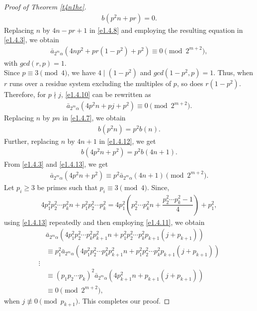 \documentclass[11pt,a4paper]{article}
\numberwithin{equation}{section}
\theoremstyle{plain}
\begin{document}
\begin{proof}[Proof of Theorem \ref{t4n1he}\unskip]
\begin{align}
b(p^2n+pr)=0.
\end{align}
Replacing $n$ by $4n-pr+1$ in \eqref{e1.4.8} and employing the resulting equation in \eqref{e1.4.3}, we obtain
\begin{align}\label{e1.4.10}
\bar{a}_{2^m\alpha}\left(4np^2+pr(1-p^2)+p^2\right)\equiv 0\pmod {2^{m+2}},
\end{align}
with $gcd(r,p)=1$.\\
Since $p\equiv 3\pmod 4$, we have $4\mid(1-p^2)$ and $gcd(1-p^2,p)=1$. Thus, when $r$ runs over a residue system excluding the multiples of $p$, so does $r(1-p^2)$. Therefore, for $p\nmid j$, \eqref{e1.4.10} can be rewritten as 
\begin{align}\label{e1.4.11}
\bar{a}_{2^m\alpha}(4p^2n+pj+p^2)\equiv 0\pmod {2^{m+2}}.
\end{align}
Replacing $n$ by $pn$ in \eqref{e1.4.7}, we obtain
\begin{align}\label{e1.4.12}
b(p^2n)=p^2b(n).
\end{align}
Further, replacing $n$ by $4n+1$ in \eqref{e1.4.12}, we get
\begin{align}\label{e1.4.13}
b(4p^2n+p^2)=p^2b(4n+1).
\end{align}
From \eqref{e1.4.3} and \eqref{e1.4.13}, we get
\begin{align}
\bar{a}_{2^m\alpha}(4p^2n+p^2)\equiv p^2\bar{a}_{2^m\alpha}(4n+1)\pmod{2^{m+2}}.
\end{align}
Let $p_i\ge 3$ be primes such that $p_i\equiv 3\pmod 4$. Since,
\begin{align*}
4p_1^2p_2^2\cdots p_k^2 n+p_1^2p_2^2\cdots p_k^2=4p_1^2\left(p_2^2\cdots p_k^2 n+\dfrac{p_2^2\cdots p_k^2 -1}{4}\right)+p_1^2,
\end{align*}
using \eqref{e1.4.13} repeatedly and then employing \eqref{e1.4.11}, we obtain
\begin{align*}
&\bar{a}_{2^m\alpha}\left(4p_1^2p_2^2\cdots p_k^2p_{k+1}^2n+p_1^2p_2^2\cdots p_k^2p_{k+1}\left(j+p_{k+1}\right)\right)\\
&\equiv p_1^2 \bar{a}_{2^m\alpha}\left(4p_1^2p_2^2\cdots p_k^2p_{k+1}^2n+p_1^2p_2^2\cdots p_k^2p_{k+1}\left(j+p_{k+1}\right)\right)\\
\vdots\\
&\equiv (p_1p_2\cdots p_k)^2\bar{a}_{2^m\alpha}\left(4p_{k+1}^2n+p_{k+1}(j+p_{k+1})\right)\\
&\equiv 0\pmod{2^{m+2}},
\end{align*}
when $j\not\equiv 0\pmod{p_{k+1}}$. This completes our proof.
\end{proof}
\end{document}

